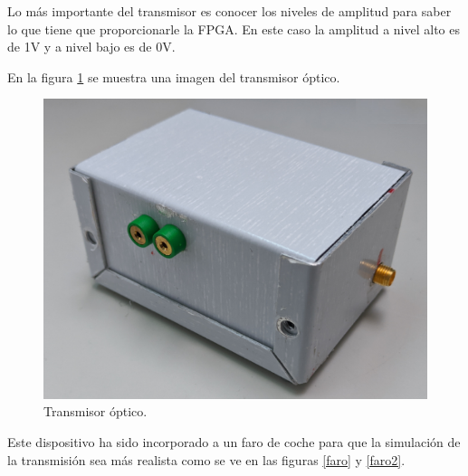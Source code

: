 Lo más importante del transmisor es conocer los niveles de amplitud para saber lo que 
tiene que proporcionarle la FPGA. En este caso la amplitud a nivel alto es de 1V y a nivel 
bajo es de 0V. 

En la figura \ref{transm} se muestra una imagen del transmisor óptico.

\begin{figure}[ht]
    \centering
    \includegraphics[scale=0.40]{./figuras/transm.png}
    \caption{\small{Transmisor óptico.}}
    \label{transm}%
\end{figure}

Este dispositivo ha sido incorporado a un faro de coche para que la simulación de la 
transmisión sea más realista como se ve en las figuras \ref{faro} y \ref{faro2}.

